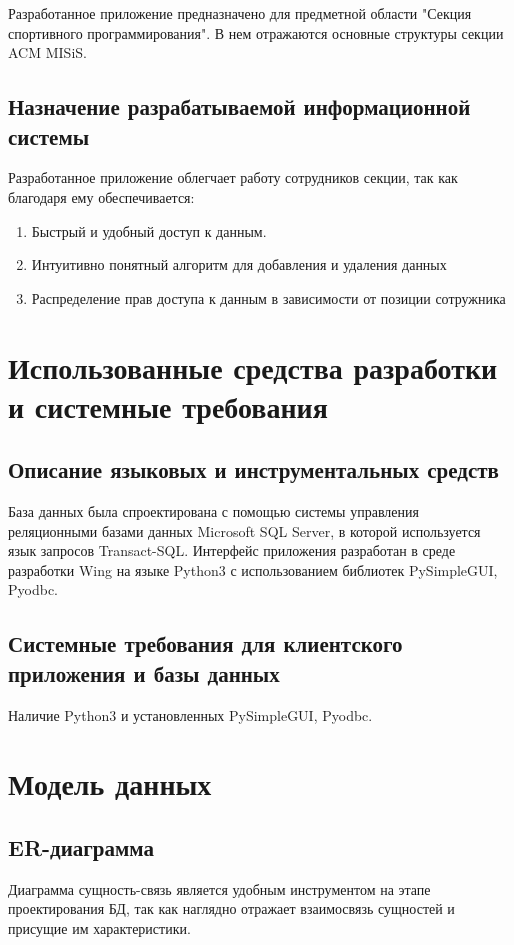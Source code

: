 \documentclass[a4paper,12pt,preview]{report} %
\begin{document}
	Разработанное приложение предназначено для предметной области "Секция спортивного программирования". В нем отражаются основные структуры секции ACM MISiS. 
	
	\section{Назначение разрабатываемой информационной системы}
	
	Разработанное приложение облегчает работу сотрудников секции, так как благодаря ему обеспечивается:
	
	\begin{enumerate}
		\item Быстрый и удобный доступ к данным.
		\item Интуитивно понятный алгоритм для добавления и удаления данных
		\item Распределение прав доступа к данным в зависимости от позиции сотружника
	\end{enumerate}
	
	\chapter{Использованные средства разработки и системные требования}
	
	\section{Описание языковых и инструментальных средств}
	
	База данных была спроектирована с помощью системы управления реляционными базами данных Microsoft SQL Server, в которой используется язык запросов Transact-SQL. Интерфейс приложения разработан в среде разработки Wing на языке Python3 с использованием библиотек PySimpleGUI, Pyodbc.
	
	\section{Системные требования для клиентского приложения и базы данных}

	Наличие Python3 и установленных PySimpleGUI, Pyodbc.
	
	
	\chapter{Модель данных}
	\section{ER-диаграмма}
	Диаграмма сущность-связь является удобным инструментом на этапе проектирования БД, так как наглядно отражает взаимосвязь сущностей и присущие им характеристики.
	
\end{document}
